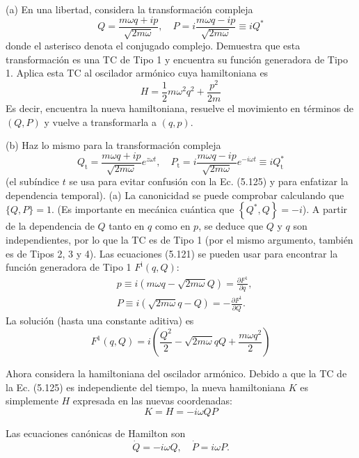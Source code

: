 \begin{example}
  
(a) En una libertad, considera la transformación compleja  
$$
Q=\frac{m \omega q+i p}{\sqrt{2 m \omega}}, \quad P=i \frac{m \omega q-i p}{\sqrt{2 m \omega}} \equiv i Q^{*} \tag{5.125}
$$  
donde el asterisco denota el conjugado complejo. Demuestra que esta transformación es una TC de Tipo 1 y encuentra su función generadora de Tipo 1. Aplica esta TC al oscilador armónico cuya hamiltoniana es  
$$
H=\frac{1}{2} m \omega^{2} q^{2}+\frac{p^{2}}{2 m}
$$  
Es decir, encuentra la nueva hamiltoniana, resuelve el movimiento en términos de $(Q, P)$ y vuelve a transformarla a $(q, p)$.

(b) Haz lo mismo para la transformación compleja  
$$
Q_{\mathrm{t}}=\frac{m \omega q+i p}{\sqrt{2 m \omega}} e^{z \omega t}, \quad P_{\mathrm{t}}=i \frac{m \omega q-i p}{\sqrt{2 m \omega}} e^{-i \omega t} \equiv i Q_{\mathrm{t}}^{*} \tag{5.126}
$$  
(el subíndice $t$ se usa para evitar confusión con la Ec. (5.125) y para enfatizar la dependencia temporal).
\hrulefill
(a) La canonicidad se puede comprobar calculando que $\{Q, P\}=1$. (Es importante en mecánica cuántica que $\left\{Q^{*}, Q\right\}=-i$). A partir de la dependencia de $Q$ tanto en $q$ como en $p$, se deduce que $Q$ y $q$ son independientes, por lo que la TC es de Tipo 1 (por el mismo argumento, también es de Tipos 2, 3 y 4). Las ecuaciones (5.121) se pueden usar para encontrar la función generadora de Tipo 1 $F^{\mathrm{i}}(q, Q)$:  
$$
\begin{aligned}
& p \equiv i(m \omega q-\sqrt{2 m \omega} Q)=\frac{\partial F^{1}}{\partial q}, \\
& P \equiv i(\sqrt{2 m \omega} q-Q)=-\frac{\partial F^{1}}{\partial Q}.
\end{aligned}
$$  
La solución (hasta una constante aditiva) es  
$$
F^{1}(q, Q)=i\left(\frac{Q^{2}}{2}-\sqrt{2 m \omega} q Q+\frac{m \omega q^{2}}{2}\right) \tag{5.127}
$$  

Ahora considera la hamiltoniana del oscilador armónico. Debido a que la TC de la Ec. (5.125) es independiente del tiempo, la nueva hamiltoniana $K$ es simplemente $H$ expresada en las nuevas coordenadas:  
$$
K=H=-i \omega Q P \tag{5.128}
$$  

Las ecuaciones canónicas de Hamilton son  
$$
\dot{Q}=-i \omega Q, \quad \dot{P}=i \omega P.
$$  


\end{example}
